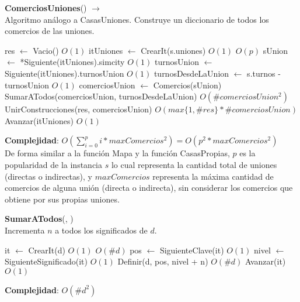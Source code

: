 \begin{Algoritmos}
\begin{algorithm}[H]{\textbf{ComerciosUniones}() $\to$ }
\\ {\small Algoritmo análogo a CasasUniones. Construye un diccionario de todos los comercios de las uniones.}
\begin{algorithmic}[1]
    \State res $\gets$ Vacio() \Comment $O(1)$
    \State itUniones $\gets$ CrearIt(s.uniones) \Comment $O(1)$
     \Comment $O(p)$
        \State sUnion $\gets$ *Siguiente(itUniones).simcity \Comment $O(1)$
        \State turnosUnion $\gets$ Siguiente(itUniones).turnosUnion \Comment $O(1)$
        \State turnosDesdeLaUnion $\gets$ s.turnos - turnosUnion \Comment $O(1)$
        \State comerciosUnion $\gets$ Comercios(sUnion)
        \State SumarATodos(comerciosUnion, turnosDesdeLaUnion) \Comment $O(\#comerciosUnion^2)$
        \State UnirConstrucciones(res, comerciosUnion) \Comment $O(max\{1, \#res\} * \#comerciosUnion)$
        \State Avanzar(itUniones) \Comment $O(1)$
    \EndWhile
\end{algorithmic}
\textbf{Complejidad}: $O( \sum_{i=0}^p i * maxComercios^2 ) = O( p^2 * maxComercios^2 )$ \\
De forma similar a la función Mapa y la función CasasPropias, $p$ es la popularidad de la instancia $s$ lo cual representa la cantidad total de uniones (directas o indirectas), y $maxComercios$ representa la máxima cantidad de comercios de alguna unión (directa o indirecta), sin considerar los comercios que obtiene por sus propias uniones.
\end{algorithm}

\begin{algorithm}[H]{\textbf{SumarATodos}(, )}
\\ {\small Incrementa $n$ a todos los significados de $d$.}
\begin{algorithmic}[1]
    \State it $\gets$ CrearIt(d) \Comment $O(1)$
     \Comment $O(\#d)$
        \State pos $\gets$ SiguienteClave(it) \Comment $O(1)$
        \State nivel $\gets$ SiguienteSignificado(it) \Comment $O(1)$
        \State Definir(d, pos, nivel + n) \Comment $O(\#d)$
        \State Avanzar(it) \Comment $O(1)$
    \EndWhile
\end{algorithmic}
\textbf{Complejidad}: $O(\#d^2)$
\end{algorithm}


\end{Algoritmos}
